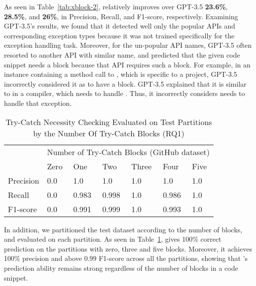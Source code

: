 As seen in Table~\ref{tab:xblock-2}, {\tool} relatively improves over
GPT-3.5 {\bf 23.6\%}, {\bf 28.5\%}, and {\bf 26\%}, in
Precision, Recall, and F1-score, respectively.
Examining GPT-3.5's results, we found that it detected well only the
popular APIs and corresponding exception types because it was not
trained specifically for the exception handling task. Moreover, for
the un-popular API names, GPT-3.5 often resorted to another API with
similar name, and predicted that the given code snippet needs a
 block because that API requires such a block. For
example, in an instance containing a method call to
, which is specific to a project,
GPT-3.5 incorrectly considered it as to have a 
block. GPT-3.5 explained that it is similar to  in a
compiler, which needs to handle . Thus, it
incorrectly considers  needs to handle that exception.



\begin{table}[t]%
  \caption{Try-Catch Necessity Checking Evaluated on Test Partitions by the Number Of Try-Catch Blocks (RQ1) }
  \vspace{-12pt}
  \small
	\begin{center}
		\renewcommand{\arraystretch}{1}
		\begin{tabular}{| p{1.0cm}<{\centering} | p{0.7cm}<{\centering} | p{0.7cm}<{\centering}| p{0.7cm}<{\centering} | p{0.7cm}<{\centering} | p{0.7cm}<{\centering} | p{0.7cm}<{\centering} | }
		  \hline
			\multirow{2}{*}{} & \multicolumn{6}{c|}{Number of Try-Catch Blocks (GitHub dataset)} \\
			\cline{2-7}
			  & Zero  & One & Two & Three & Four & Five\\
			\hline
			Precision & 0.0 &  1.0 & 1.0 & 1.0 & 1.0 & 1.0\\
			\hline
			Recall   & 0.0 &  0.983 & 0.998 & 1.0 & 0.986 & 1.0\\
			\hline
			F1-score   & 0.0  &  0.991 & 0.999 & 1.0 & 0.993 & 1.0\\
			\hline
		\end{tabular}
		\label{tab:rq1-detailed-result}
	\end{center}
\end{table}

In addition, we partitioned the test dataset according to the number
of  blocks, and evaluated {\xblock} on each
partition. As seen in Table~\ref{tab:rq1-detailed-result}, {\xblock}
gives 100\% correct prediction on the partitions with zero, three and
five  blocks. Moreover, it achieves 100\% precision
and above 0.99 F1-score across all the partitions, showing that
{\xblock}'s prediction ability remains strong regardless of the number
of  blocks in a code snippet.

